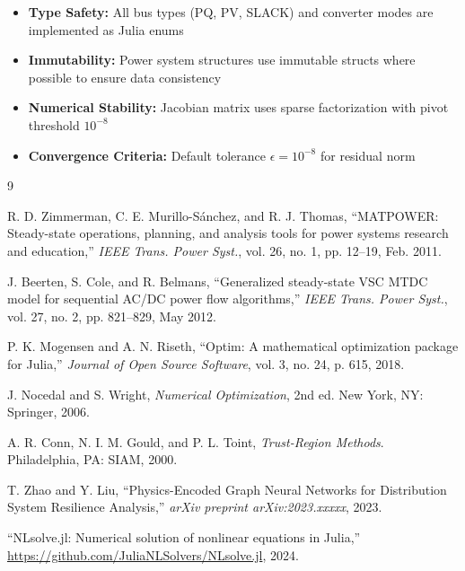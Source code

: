 \documentclass[11pt]{article}
\begin{document}
\begin{itemize}
    \item \textbf{Type Safety:} All bus types (PQ, PV, SLACK) and converter modes are implemented as Julia enums
    \item \textbf{Immutability:} Power system structures use immutable structs where possible to ensure data consistency
    \item \textbf{Numerical Stability:} Jacobian matrix uses sparse factorization with pivot threshold $10^{-8}$
    \item \textbf{Convergence Criteria:} Default tolerance $\epsilon = 10^{-8}$ for residual norm
\end{itemize}


\begin{thebibliography}{9}

R. D. Zimmerman, C. E. Murillo-Sánchez, and R. J. Thomas,
``MATPOWER: Steady-state operations, planning, and analysis tools for power systems research and education,''
\textit{IEEE Trans. Power Syst.}, vol. 26, no. 1, pp. 12--19, Feb. 2011.

J. Beerten, S. Cole, and R. Belmans,
``Generalized steady-state VSC MTDC model for sequential AC/DC power flow algorithms,''
\textit{IEEE Trans. Power Syst.}, vol. 27, no. 2, pp. 821--829, May 2012.

P. K. Mogensen and A. N. Riseth,
``Optim: A mathematical optimization package for Julia,''
\textit{Journal of Open Source Software}, vol. 3, no. 24, p. 615, 2018.

J. Nocedal and S. Wright,
\textit{Numerical Optimization}, 2nd ed.
New York, NY: Springer, 2006.

A. R. Conn, N. I. M. Gould, and P. L. Toint,
\textit{Trust-Region Methods}.
Philadelphia, PA: SIAM, 2000.

T. Zhao and Y. Liu,
``Physics-Encoded Graph Neural Networks for Distribution System Resilience Analysis,''
\textit{arXiv preprint arXiv:2023.xxxxx}, 2023.

``NLsolve.jl: Numerical solution of nonlinear equations in Julia,''
\url{https://github.com/JuliaNLSolvers/NLsolve.jl}, 2024.

\end{thebibliography}
\end{document}
